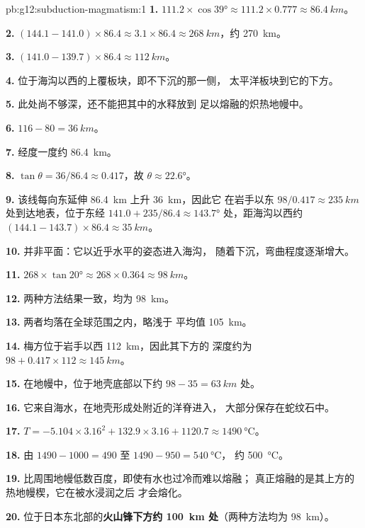 \begin{solution}{pb:g12:subduction-magmatism:1}
\textbf{1.} $111.2 \times \cos\ang{39} \approx 111.2 \times 0.777 \approx
\qty{86.4}{km}$。

\textbf{2.} $(144.1 - 141.0) \times 86.4 \approx 3.1 \times 86.4 \approx
\qty{268}{km}$，约 \qty{270}{km}。

\textbf{3.} $(141.0 - 139.7) \times 86.4 \approx \qty{112}{km}$。

\textbf{4.} 位于海沟以西的上覆板块，即不下沉的那一侧，
太平洋板块到它的下方。

\textbf{5.} 此处尚不够深，还不能把其中的水释放到
足以熔融的炽热地幔中。

\textbf{6.} $116 - 80 = \qty{36}{km}$。

\textbf{7.} 经度一度约 \qty{86.4}{km}。

\textbf{8.} $\tan\theta = 36/86.4 \approx 0.417$，故 $\theta \approx
\ang{22.6}$。

\textbf{9.} 该线每向东延伸 \qty{86.4}{km} 上升 \qty{36}{km}，因此它
在岩手以东 $98/0.417 \approx \qty{235}{km}$ 处到达地表，位于东经
$141.0 + 235/86.4 \approx \ang{143.7}$ 处，距海沟以西约 $(144.1 - 143.7) \times 86.4
\approx \qty{35}{km}$。

\textbf{10.} 并非平面：它以近乎水平的姿态进入海沟，
随着下沉，弯曲程度逐渐增大。

\textbf{11.} $268 \times \tan\ang{20} \approx 268 \times 0.364 \approx
\qty{98}{km}$。

\textbf{12.} 两种方法结果一致，均为 \qty{98}{km}。

\textbf{13.} 两者均落在全球范围之内，略浅于
平均值 \qty{105}{km}。

\textbf{14.} 梅方位于岩手以西 \qty{112}{km}，因此其下方的
深度约为 $98 + 0.417 \times 112 \approx \qty{145}{km}$。

\textbf{15.} 在地幔中，位于地壳底部以下约
$98 - 35 = \qty{63}{km}$ 处。

\textbf{16.} 它来自海水，在地壳形成处附近的洋脊进入，
大部分保存在蛇纹石中。

\textbf{17.} $T = -5.104 \times 3.16^2 + 132.9 \times 3.16 + 1120.7 \approx
\qty{1490}{\celsius}$。

\textbf{18.} 由 $1490 - 1000 = 490$ 至 $1490 - 950 = \qty{540}{\celsius}$，
约 \qty{500}{\celsius}。

\textbf{19.} 比周围地幔低数百度，即使有水也过冷而难以熔融；
真正熔融的是其上方的热地幔楔，它在被水浸润之后
才会熔化。

\textbf{20.} 位于日本东北部的\textbf{火山锋下方约 \qty{100}{km}
处}（两种方法均为 \qty{98}{km}）。
\end{solution}
